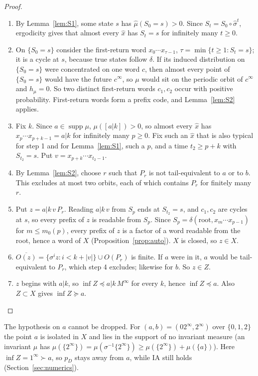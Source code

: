 \documentclass[11pt]{amsart}
\theoremstyle{definition}
\theoremstyle{remark}
\newcommand{\lex}{\preccurlyeq}
\newcommand{\gex}{\succcurlyeq}
\begin{document}
\begin{proof}
\begin{enumerate}
\item By Lemma~\ref{lem:S1}, some state $s$ has $\hat\mu(S_0=s)>0$. Since $S_t=S_0\circ\hat\sigma^t$, ergodicity gives that almost every $\hat x$ has $S_t=s$ for infinitely many $t\ge0$.
\item On $\{S_0=s\}$ consider the first-return word $x_0\cdots x_{\tau-1}$, $\tau=\min\{t\ge1:S_t=s\}$; it is a cycle at $s$, because true states follow $\delta$. If its induced distribution on $\{S_0=s\}$ were concentrated on one word $c$, then almost every point of $\{S_0=s\}$ would have the future $c^\infty$, so $\mu$ would sit on the periodic orbit of $c^\infty$ and $h_\mu=0$. So two distinct first-return words $c_1,c_2$ occur with positive probability. First-return words form a prefix code, and Lemma~\ref{lem:S2} applies.
\item Fix $k$. Since $a\in\operatorname{supp}\mu$, $\mu([a|k])>0$, so almost every $\hat x$ has $x_p\cdots x_{p+k-1}=a|k$ for infinitely many $p\ge0$. Fix such an $\hat x$ that is also typical for step 1 and for Lemma~\ref{lem:S1}, such a $p$, and a time $t_2\ge p+k$ with $S_{t_2}=s$. Put $v=x_{p+k}\cdots x_{t_2-1}$.
\item By Lemma~\ref{lem:S2}, choose $r$ such that $P_r$ is not tail-equivalent to $a$ or to $b$. This excludes at most two orbits, each of which contains $P_r$ for finitely many $r$.
\item Put $z=a|k\,v\,P_r$. Reading $a|k\,v$ from $S_p$ ends at $S_{t_2}=s$, and $c_1,c_2$ are cycles at $s$, so every prefix of $z$ is readable from $S_p$. Since $S_p=\delta(\text{root},x_m\cdots x_{p-1})$ for $m\le m_0(p)$, every prefix of $z$ is a factor of a word readable from the root, hence a word of $X$ (Proposition~\ref{prop:auto}). $X$ is closed, so $z\in X$.
\item $\overline{O(z)}=\{\sigma^iz:i<k+|v|\}\cup O(P_r)$ is finite. If $a$ were in it, $a$ would be tail-equivalent to $P_r$, which step 4 excludes; likewise for $b$. So $z\in Z$.
\item $z$ begins with $a|k$, so $\inf Z\lex a|k\,M^\infty$ for every $k$, hence $\inf Z\lex a$. Also $Z\subset X$ gives $\inf Z\gex a$.
\end{enumerate}
\end{proof}

The hypothesis on $a$ cannot be dropped. For $(a,b)=(02^\infty,2^\infty)$ over $\{0,1,2\}$ the point $a$ is isolated in $X$ and lies in the support of no invariant measure (an invariant $\mu$ has $\mu(\{2^\infty\})=\mu(\sigma^{-1}\{2^\infty\})\ge\mu(\{2^\infty\})+\mu(\{a\})$). Here $\inf Z=1^\infty\succ a$, so $p_D$ stays away from $a$, while IA still holds (Section~\ref{sec:numerics}).
\end{document}
